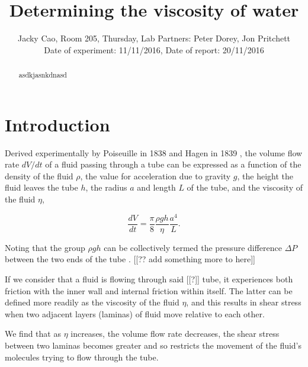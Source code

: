 \documentclass[twocolumn]{revtex4}
\begin{document}
\textheight=26.385cm

\title{Determining the viscosity of water} 
 
 
\author{Jacky Cao, Room 205, Thursday, Lab Partners: Peter Dorey, Jon Pritchett \\ Date of experiment: 11/11/2016, Date of report: 20/11/2016}


\begin{abstract}              
 
asdkjasnkdnasd

\end{abstract}

\maketitle

\section{Introduction} 
\vspace{-2ex} 

Derived experimentally by Poiseuille in 1838 and Hagen in 1839 \cite{poiseuillehagen}, the volume flow rate $dV/dt$ of a fluid passing through a tube can be expressed as a function of the density of the fluid $\rho$, the value for acceleration due to gravity $g$, the height the fluid leaves the tube $h$, the radius $a$ and length $L$ of the tube, and the viscosity of the fluid $\eta$,

\begin{equation} 
\frac{dV}{dt}=\frac{\pi}{8}\frac{\rho gh}{\eta}\frac{a^4}{L}. 
\label{pohagen}
\end{equation}

Noting that the group $\rho gh$ can be collectively termed the pressure difference $\Delta P$ between the two ends of the tube \cite{collegephysics}. [[?? add something more to here]]

If we consider that a fluid is flowing through said [[?]] tube, it experiences both friction with the inner wall and internal friction within itself. The latter can be defined more readily as the viscosity of the fluid $\eta$, and this results in shear stress when two adjacent layers (laminas) of fluid move relative to each other. 

We find that as $\eta$ increases, the volume flow rate decreases, the shear stress between two laminas becomes greater and so restricts the movement of the fluid's molecules trying to flow through the tube. 
\end{document}
